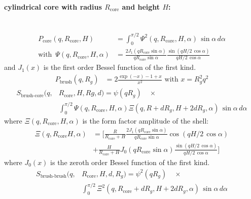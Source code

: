 \clearpage
\noindent\paragraph{cylindrical core with radius $R_\text{core}$ and height $H$:}
\label{sect:CylMicelles}
~\\
\begin{align}
P_\text{core}(q,R_\text{core},H) &= \int_0^{\pi/2}\Psi^2(q,R_\text{core},H,\alpha) \, \sin\alpha \, d\alpha \\
\text{with~} \, \Psi(q,R_\text{core},H,\alpha) &=
    \frac{2J_1(qR_\text{core}\sin\alpha)}{qR_\text{core}\sin\alpha}
    \frac{\sin(qH/2\, \cos\alpha)}{qH/2\, \cos\alpha}
\end{align}
and $J_1(x)$ is the first order Bessel function of the first kind.
\begin{align}
P_\text{brush}(q,R_g)&= 2\frac{\exp(-x)-1+x}{x^2} \text{~with~} x = R_g^2q^2
\end{align}
\begin{align}
S_\text{brush-core}(q,& R_\text{core},H,Rg,d) = \psi(qR_g) \quad \times \\
   & \int_0^{\pi/2} \Psi(q,R_\text{core},H,\alpha) \Xi(q,R+dR_g,H+2dR_g,\alpha) \, \sin\alpha \, d\alpha \nonumber
\end{align}
where $\Xi(q,R_\text{core},H,\alpha)$ is the form factor amplitude of the shell:
\begin{align}
\Xi(q, R_\text{core} H,\alpha)  &= \biggl[ \frac{R}{R_\text{core}+H} \frac{2J_1(qR_\text{core}\sin\alpha)}{qR_\text{core}\sin\alpha} \cos(qH/2\, \cos\alpha) \\
                                &+ \frac{H}{R_\text{core}+H} J_0(qR_\text{core}\sin\alpha) \frac{\sin(qH/2\, \cos\alpha)}{qH/2\, \cos\alpha} \biggr] \nonumber
\end{align}
where $J_0(x)$ is the zeroth order Bessel function of the first kind.
\begin{align}
S_\text{brush-brush}(q,& R_\text{core},H,d,R_g) = \psi^2(qR_g) \quad \times \\
 &\int_0^{\pi/2} \Xi^2(q,R_\text{core}+dR_g,H+2dR_g,\alpha)\, \sin\alpha \, d\alpha \nonumber
\end{align}

